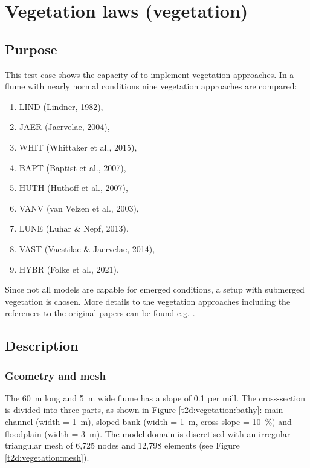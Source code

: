 \chapter{Vegetation laws (vegetation)}

\section{Purpose}
This test case shows the capacity of  to implement vegetation approaches.
In a flume with nearly normal conditions nine vegetation approaches are compared:
\begin{enumerate}
\item LIND (Lindner, 1982),
\item JAER (Jaervelae, 2004),
\item WHIT (Whittaker et al., 2015),
\item BAPT (Baptist et al., 2007),
\item HUTH (Huthoff et al., 2007),
\item VANV (van Velzen et al., 2003),
\item LUNE (Luhar \& Nepf, 2013),
\item VAST (Vaestilae \& Jaervelae, 2014),
\item HYBR (Folke et al., 2021).
\end{enumerate}

Since not all models are capable for emerged conditions, a setup with submerged
vegetation is chosen.
More details to the vegetation approaches including the references to the
original papers can be found e.g. \cite{folke2019vegetation}.

\section{Description}

\subsection{Geometry and mesh}

The 60~m long and 5~m wide flume has a slope of 0.1 per mill.
The cross-section is divided into three parts, as shown in Figure
\ref{t2d:vegetation:bathy}:
main channel (width = 1~m), sloped bank (width = 1~m, cross slope = 10~\%) and
floodplain (width = 3~m).
The model domain is discretised with an irregular triangular mesh of 6,725 nodes
and 12,798 elements (see Figure \ref{t2d:vegetation:mesh}).

